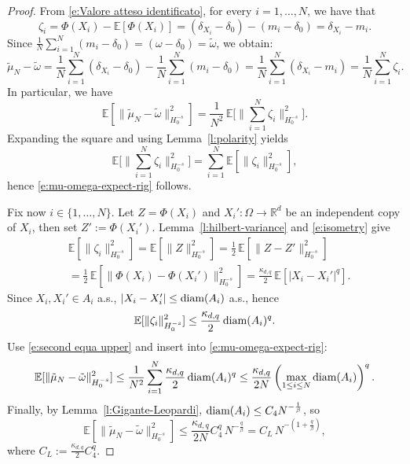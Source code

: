 \documentclass[12pt,a4paper,oneside]{amsart}
\theoremstyle{plain}
\theoremstyle{definition}
\numberwithin{equation}{section}
\numberwithin{figure}{section}
\numberwithin{table}{section}
\theoremstyle{remark}
\newcommand{\R}{\mathbb{R}}
\newcommand{\diam}{\textup{diam}}
\newcommand{\expAhlfors}{\beta}
\begin{document}
\begin{proof}
From \eqref{e:Valore atteso identificato}, for every $i=1,\dots,N$, we have that  
\begin{equation*}
\zeta_i
=\Phi(X_i)-\mathbb E[\Phi(X_i)]
=(\delta_{X_i}-\delta_{0})-(m_i-\delta_{0})
=\delta_{X_i}-m_i.    
\end{equation*}
Since $\frac1N\sum_{i=1}^N (m_i-\delta_0)=(\omega-\delta_0)=\tilde{\omega}$, we obtain:
\begin{equation*}
\tilde{\mu}_N-\tilde{\omega}=\frac1N\sum_{i=1}^N(\delta_{X_i}-\delta_0)-\frac1N\sum_{i=1}^N(m_i-\delta_0) = \frac1N\sum_{i=1}^N(\delta_{X_i}-m_i)=\frac1N\sum_{i=1}^N\zeta_i.
\end{equation*}
In particular, we have
\begin{equation*}
  \mathbb E[\|\tilde{\mu}_N-\tilde{\omega}\|_{H^{-s}_0}^2]
=\frac1{N^2}\,\mathbb E\big[\big\|\sum_{i=1}^N\zeta_i\big\|_{H^{-s}_0}^2\big].  
\end{equation*}
Expanding the square and using Lemma~\ref{l:polarity} yields
\begin{equation*}
\mathbb E\big[\big\|\sum_{i=1}^N\zeta_i\big\|_{H^{-s}_0}^2\big]
=\sum_{i=1}^N \mathbb E[\|\zeta_i\|_{H_0^{-s}}^2],   \end{equation*}
hence \eqref{e:mu-omega-expect-rig} follows.

Fix now $i\in \{1,\dots,N\}$. Let $Z=\Phi(X_i)$ and $X_i':\Omega \to \R^d$ be an independent copy of $X_i$, then set $Z':=\Phi(X_i')$.
Lemma~\ref{l:hilbert-variance} and \eqref{e:isometry} give
\begin{align} \label{e:second equa upper}
& \mathbb E[\|\zeta_i\|_{H^{-s}_0}^2]=\mathbb E[\|Z\|_{H^{-s}_0}^2] =\frac12\,\mathbb E[\|Z-Z'\|_{H^{-s}_0}^2]
\\ & =\frac12\,\mathbb E[\|\Phi(X_i)-\Phi(X_i')\|_{H^{-s}_0}^2]=\frac{\kappa_{d,q}}{2}\,\mathbb E[|X_i-X_i'|^q] . \nonumber   
\end{align}
Since $X_i,X_i'\in A_i$ a.s., $|X_i-X_i'|\le \diam(A_i)$ a.s., hence
\begin{equation*}
\mathbb E[\|\zeta_i\|_{H^{-s}_0}^2] \le \frac{\kappa_{d,q}}{2}\,\diam(A_i)^q.    
\end{equation*}
Use \eqref{e:second equa upper} and insert into \eqref{e:mu-omega-expect-rig}:
\begin{equation*}
\mathbb E[\|\tilde{\mu}_N-\tilde{\omega}\|_{H^{-s}_0}^2]
\le \frac1{N^2}\sum_{i=1}^N \frac{\kappa_{d,q}}{2}\,\diam(A_i)^q
\le \frac{\kappa_{d,q}}{2N}\left(\max_{1\le i\le N}\diam(A_i)\right)^q.    
\end{equation*}
Finally, by Lemma~\ref{l:Gigante-Leopardi}, $\diam(A_i)\le C_4 N^{-\frac1\expAhlfors}$, so
\begin{equation*}
\mathbb E[\|\tilde{\mu}_N-\tilde{\omega}\|_{H^{-s}_0}^2] \le \frac{\kappa_{d,q}}{2N}C_4^q\,N^{-\frac{q}{\expAhlfors}}
= C_L\,N^{-(1+\frac{q}{\expAhlfors})},    
\end{equation*}
where $C_L:= \frac{\kappa_{d,q}}{2}C_4^q$.
\end{proof}
\end{document}

